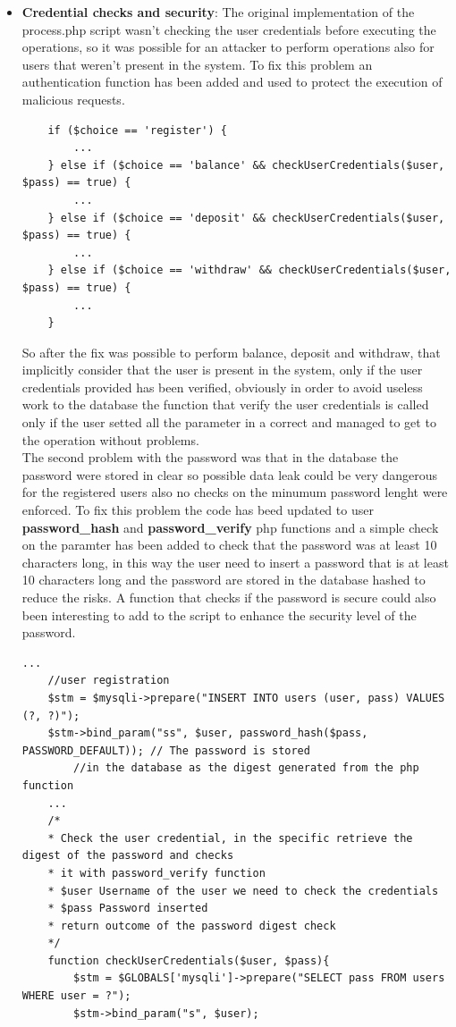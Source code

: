 \documentclass[14pt]{article}
\begin{document}
\begin{itemize}
	\item \textbf{Credential checks and security}: The original implementation of the process.php script wasn't checking the user credentials before executing the operations, so it was possible for an attacker to perform operations also for users that weren't present in the system. To fix this problem an authentication function has been added and used to protect the execution of malicious requests.
	\begin{Verbatim}
	if ($choice == 'register') {
		...
	} else if ($choice == 'balance' && checkUserCredentials($user, $pass) == true) {
		...
	} else if ($choice == 'deposit' && checkUserCredentials($user, $pass) == true) {
		...
	} else if ($choice == 'withdraw' && checkUserCredentials($user, $pass) == true) {
		... 
	} 
	\end{Verbatim}
	So after the fix was possible to perform balance, deposit and withdraw, that implicitly consider that the user is present in the system, only if the user credentials provided has been verified, obviously in order to avoid useless work to the database the function that verify the user credentials is called only if the user setted all the parameter in a correct and managed to get to the operation without problems.
	\\
	The second problem with the password was that in the database the password were stored in clear so possible data leak could be very dangerous for the registered users also no checks on the minumum password lenght were enforced. To fix this problem the code has beed updated to user \textbf{password\_hash} and \textbf{password\_verify} php functions and a simple check on the paramter has been added to check that the password was at least 10 characters long, in this way the user need to insert a password that is at least 10 characters long and the password are stored in the database hashed to reduce the risks. A function that checks if the password is secure could also been interesting to add to the script to enhance the security level of the password. 
	\begin{Verbatim}[tabsize=4]
	...
	//user registration
	$stm = $mysqli->prepare("INSERT INTO users (user, pass) VALUES (?, ?)");
	$stm->bind_param("ss", $user, password_hash($pass, PASSWORD_DEFAULT)); // The password is stored 
		//in the database as the digest generated from the php function
	...
	/*
	* Check the user credential, in the specific retrieve the digest of the password and checks
	* it with password_verify function
	* $user Username of the user we need to check the credentials
	* $pass Password inserted
	* return outcome of the password digest check
	*/
	function checkUserCredentials($user, $pass){
		$stm = $GLOBALS['mysqli']->prepare("SELECT pass FROM users WHERE user = ?");
		$stm->bind_param("s", $user);
		

\end{Verbatim}
\end{itemize}
\end{document}
